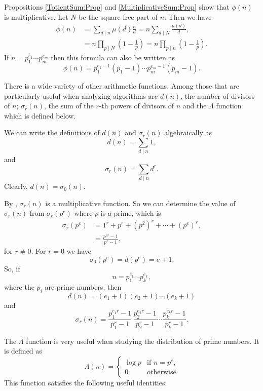 Propositions \ref{TotientSum:Prop} and \ref{MultiplicativeSum:Prop} show that
$\phi(n)$ is multiplicative.  Let $N$ be the square free part of $n$.
Then we have
\[
\begin{aligned}
  \phi(n) &= \sum_{d\mid n} \mu(d) \frac{n}{d} =
      n \sum_{d\mid N} \frac{\mu(d)}{d},\\
    &= n \prod_{p\mid N} \left(1 - \frac{1}{p}\right) = 
      n \prod_{p\mid n} \left(1 - \frac{1}{p}\right).
\end{aligned}
\]
If $n = p_1^{e_1} \cdots p_m^{e_m}$ then this formula can also be
written as 
\[
\phi(n) = p_1^{e_1-1} (p_1 - 1) \cdots p_m^{e_m-1} (p_m - 1).
\]


\medskip
There is a wide variety of other arithmetic functions.  Among those that are
particularly useful when analyzing algorithms are $d(n)$, the
number of divisors of $n$; $\sigma_r(n)$, the sum of the $r$-th
powers of divisors of $n$ and the $\Lambda$ function which is defined
below.

We can write the definitions of $d(n)$ and $\sigma_r(n)$ algebraically
as 
\[
d(n) = \sum_{d\mid n} 1,
\]
and
\[
\sigma_r(n) = \sum_{d\mid n} d^r.
\]
Clearly, $d(n) = \sigma_0(n)$.

By , $\sigma_r(n)$ is a multiplicative
function. So we can determine the value of $\sigma_r(n)$ from
$\sigma_r(p^e)$ where $p$ is a prime, which is
\[
\begin{aligned}
\sigma_r(p^e) & = 1^r + p^r + (p^2)^r + \cdots + (p^e)^r, \\
 & = \displaystyle \frac{p^{er} - 1}{p^r - 1},
\end{aligned}
\]
for $r \not= 0$.  For $r=0$ we have
\[
\sigma_0(p^e) = d(p^e) = e + 1.
\]
So, if
\[
n = p_1^{e_1} \cdots p_k^{e_k}, 
\] 
where the $p_i$ are prime numbers, then 
\[
d(n) = (e_1 + 1) (e_2 + 1) \cdots (e_k + 1)
\]
and
\[
\sigma_r(n) = \frac{p_1^{e_1 r} - 1}{p_1^{r} - 1} \, 
\frac{p_2^{e_2 r} - 1}{p_2^{r} - 1} \cdots
\frac{p_k^{e_k r} - 1}{p_k^{r} - 1}.
\]


The $\Lambda$ function is very useful when studying the distribution
of prime numbers.  It is defined as
\[
\Lambda(n) = 
  \begin{cases}
    \log p & \text{if $n = p^{e}$,} \\
    0 & \text{otherwise}
  \end{cases}
\]
This function satisfies the following useful identities:

